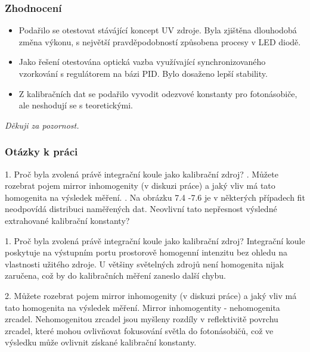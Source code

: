 \documentclass{beamer}
\begin{document}
\begin{frame}
\frametitle{Zhodnocení}
\begin{itemize}
 \item Podařilo se otestovat stávájící koncept UV zdroje. Byla zjištěna dlouhodobá změna výkonu, s největší pravděpodobností způsobena procesy v LED diodě.
 \item Jako řešení otestována optická vazba využívající synchronizovaného vzorkování s regulátorem na bázi PID. Bylo dosaženo lepší stability.
 \item Z kalibračních dat se podařilo vyvodit odezvové konstanty pro fotonásobiče, ale neshodují se s teoretickými.
\end{itemize}

\end{frame}


\begin{frame}{}
  \centering \Large
  \emph{Děkuji za pozornost.}
\end{frame}


\begin{frame}{}
\frametitle{Otázky k práci}
  
1. Proč byla zvolená právě integrační koule jako kalibrační zdroj?
. Můžete rozebrat pojem mirror inhomogenity (v diskuzi práce) a jaký vliv má tato homogenita na výsledek měření.
. Na obrázku 7.4 -7.6 je v některých případech fit neodpovídá distribuci naměřených dat. Neovlivní tato nepřesnost výsledné extrahované kalibrační konstanty?
\end{frame}


\begin{frame}{}
1. Proč byla zvolená právě integrační koule jako kalibrační zdroj?
\newline
\newline
\newline
Integrační koule poskytuje na výstupním portu prostorově homogenní intenzitu bez ohledu na vlastnosti užitého zdroje. U většiny světelných zdrojů není homogenita nijak zaručena, což by do kalibračních měření zaneslo další chybu.

\end{frame}



\begin{frame}{}
2. Můžete rozebrat pojem mirror inhomogenity (v diskuzi práce) a jaký vliv má tato homogenita na výsledek měření.
\newline
\newline
\newline
Mirror inhomogentity - nehomogenita zrcadel. Nehomogenitou zrcadel jsou myšleny rozdíly v reflektivitě povrchu zrcadel, které mohou ovlivňovat fokusování světla do fotonásobičů, což ve výsledku může ovlivnit získané kalibrační konstanty.

\end{frame}
\end{document}
